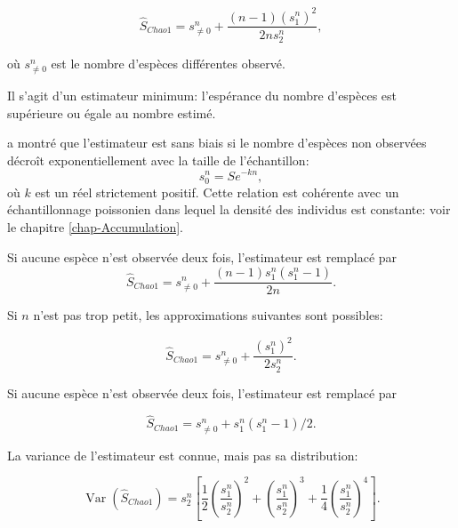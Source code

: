 \documentclass[
  11pt,
  french,
  a4paper,
  extrafontsizes,onecolumn,openright
  ]{memoir}
\begin{document}
\begin{equation}
  \label{eq:Chao1}
  {\hat{S}}_\mathit{Chao1} 
   = s^{n}_{\ne 0} + \frac{\left(n-1 \right){\left(s^{n}_{1}\right)}^2}{2n{s^{n}_{2}}},
\end{equation}

où \(s^{n}_{\ne 0}\) est le nombre d'espèces différentes observé.

Il s'agit d'un estimateur minimum: l'espérance du nombre d'espèces est supérieure ou égale au nombre estimé.

\textcite{Beguinot2014} a montré que l'estimateur est sans biais si le nombre d'espèces non observées décroît exponentiellement avec la taille de l'échantillon:
\begin{equation}
  \label{eq:BiaisChao}
  s^{n}_{0} = S e^{-kn},
\end{equation}
où \(k\) est un réel strictement positif.
Cette relation est cohérente avec un échantillonnage poissonien dans lequel la densité des individus est constante: voir le chapitre \ref{chap-Accumulation}.

Si aucune espèce n'est observée deux fois, l'estimateur est remplacé par
\begin{equation}
  \label{eq:Chao1sansf2}
  {\hat{S}}_\mathit{Chao1} = s^{n}_{\ne 0} + \frac{\left(n-1\right){s^{n}_{1}}\left(s^{n}_{1}-1\right)}{2n}.
\end{equation}

Si \(n\) n'est pas trop petit, les approximations suivantes sont possibles:

\begin{equation}
  \label{eq:Chao1sansn}
  \hat{S}_\mathit{Chao1}
   = {s^{n}_{\ne 0}} + \frac{{\left(s^{n}_{1}\right)}^2}{2s^{n}_{2}}.
\end{equation}

Si aucune espèce n'est observée deux fois, l'estimateur est remplacé \autocite{Chao2004} par

\begin{equation}
  \label{eq:Chao1sansnf2}
  {\hat{S}}_\mathit{Chao1} 
  = {s^{n}_{\ne 0}}+{s^{n}_{1}\left(s^{n}_{1}-1\right)}/{2}.
\end{equation}

La variance de l'estimateur est connue, mais pas sa distribution:

\begin{equation}
  \label{eq:VarChao1}
  \operatorname{Var}{\left({\hat{S}}_\mathit{Chao1}\right)} 
   = {s^{n}_{2}}\left[\frac{1}{2}{\left(\frac{s^{n}_{1}}{s^{n}_{2}}\right)}^2 + {\left(\frac{s^{n}_{1}}{s^{n}_{2}}\right)}^3 + \frac{1}{4}{\left(\frac{s^{n}_{1}}{s^{n}_{2}}\right)}^4\right].
\end{equation}
\end{document}
